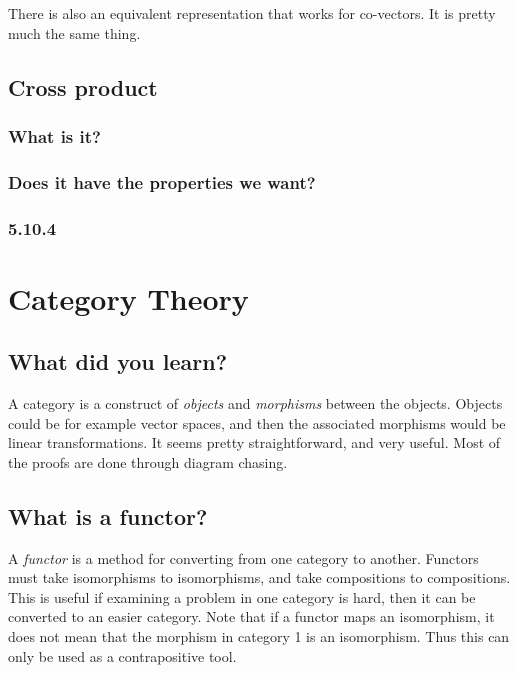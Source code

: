 \documentclass[12pt]{armath}
\begin{document}
  There is also an equivalent representation that works for co-vectors. It is
  pretty much the same thing.

  \subsection{Cross product}%
  \label{sub:cross_product}

  \subsubsection{What is it?}%
  \label{ssub:what_is_it_}

  \subsubsection{Does it have the properties we want?}%
  \label{ssub:does_it_have_the_properties_we_want_}

  \subsubsection{5.10.4}%
  \label{ssub:5_10_4}

  \section{Category Theory}%
  \label{sec:category_theory}

  \subsection{What did you learn?}%
  \label{sub:what_did_you_learn_}

  A category is a construct of \textit{objects} and \textit{morphisms} between
  the objects. Objects could be for example vector spaces, and then the
  associated morphisms would be linear transformations. It seems pretty
  straightforward, and very useful. Most of the proofs are done through diagram
  chasing.

  \subsection{What is a functor?}%
  \label{sub:what_is_a_functor_}

  A \textit{functor} is a method for converting from one category to another.
  Functors must take isomorphisms to isomorphisms, and take compositions to
  compositions. This is useful if examining a problem in one category is hard,
  then it can be converted to an easier category. Note that if a functor maps an
  isomorphism, it does not mean that the morphism in category 1 is an
  isomorphism. Thus this can only be used as a contrapositive tool.


      
\end{document}
